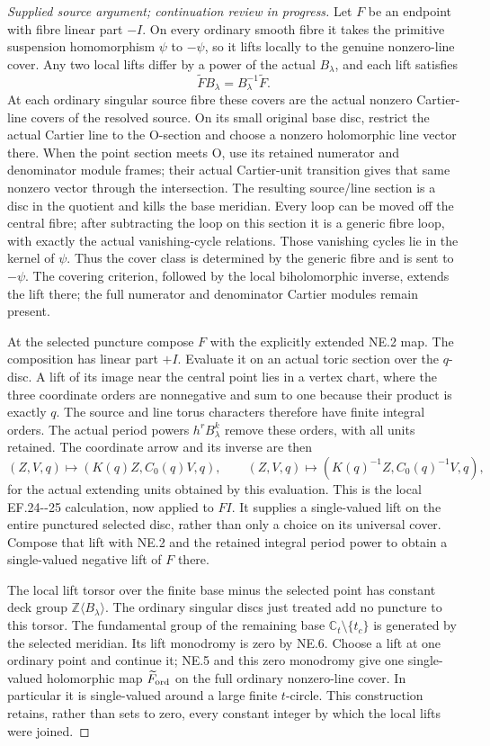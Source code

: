 \begin{proof}[Supplied source argument; continuation review in progress]
Let \(F\) be an endpoint with fibre linear part \(-I\). On every
ordinary smooth fibre it takes the primitive suspension homomorphism
\(\psi\) to \(-\psi\), so it lifts locally to the genuine nonzero-line
cover. Any two local lifts differ by a power of the actual
\(B_\lambda\), and each lift satisfies
\[
                   \widetilde F B_\lambda
                        =B_\lambda^{-1}\widetilde F.
 \tag{NE.5}
\]
At each ordinary singular source fibre these covers are the actual
nonzero Cartier-line covers of the resolved source. On its small
original base disc, restrict the actual Cartier line to the O-section
and choose a nonzero holomorphic line vector there. When the point
section meets O, use its retained numerator and denominator module
frames; their actual Cartier-unit transition gives that same nonzero
vector through the intersection. The resulting source/line section
is a disc in the quotient and kills the base meridian. Every loop can
be moved off the central fibre; after subtracting the loop on this
section it is a generic fibre loop, with exactly the actual
vanishing-cycle relations. Those vanishing cycles lie in the kernel
of \(\psi\). Thus the cover class is determined by the generic fibre
and is sent to \(-\psi\). The covering criterion, followed by the
local biholomorphic inverse, extends the lift there; the full
numerator and denominator Cartier modules remain present.

At the selected puncture compose \(F\) with the explicitly extended
NE.2 map. The composition has linear part \(+I\). Evaluate it on
an actual toric section over the \(q\)-disc. A lift of its image
near the central point lies in a vertex chart, where the three
coordinate orders are nonnegative and sum to one because their
product is exactly \(q\). The source and line torus characters
therefore have finite integral orders. The actual period powers
\(h^rB_\lambda^k\) remove these orders, with all units retained.
The coordinate arrow and its inverse are then
\[
 (Z,V,q)\longmapsto(K(q)Z,C_0(q)V,q),\qquad
 (Z,V,q)\longmapsto(K(q)^{-1}Z,C_0(q)^{-1}V,q),
 \tag{NE.6}
\]
for the actual extending units obtained by this evaluation. This is
the local EF.24-\/-25 calculation, now applied to \(FI\). It supplies
a single-valued lift on the entire punctured selected disc, rather
than only a choice on its universal cover. Compose that lift with
NE.2 and the retained integral period power to obtain a
single-valued negative lift of \(F\) there.

The local lift torsor over the finite base minus the selected point
has constant deck group \(\mathbb Z\langle B_\lambda\rangle\).
The ordinary singular discs just treated add no puncture to this
torsor. The fundamental group of the remaining base
\(\mathbb C_t\setminus\{t_c\}\) is generated by the selected
meridian. Its lift monodromy is zero by NE.6. Choose a lift at one
ordinary point and continue it; NE.5 and this zero monodromy give
one single-valued holomorphic map \(\widetilde F_{\rm ord}\) on
the full ordinary nonzero-line cover. In particular it is
single-valued around a large finite \(t\)-circle. This construction
retains, rather than sets to zero, every constant integer by which
the local lifts were joined.


\end{proof}
